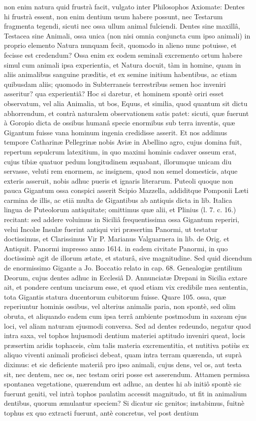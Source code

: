 \documentclass[a4paper, 11pt, oneside, polutonikogreek, german]{article}
\begin{document}
non enim natura quid frustrà facit, vulgato inter Philosophos Axiomate: Dentes hi frustrà essent, non enim dentium usum habere possunt, nec Testarum fragmenta tegendi, sicuti nec ossa ullum animal fulciendi. Dentes sine maxillâ, Testacea sine Animali, ossa unica (non nisi omnia conjuncta cum ipso animali) in proprio elemento Natura nunquam fecit, quomodo in alieno nunc potuisse, et fecisse est credendum? Ossa enim ex eodem seminali excremento ortum habere simul cum animali ipsa experientia, et Natura docuit, tàm in homine, quam in aliis animalibus sanguine præditis, et ex semine initium habentibus, ac etiam quibusdam aliis; quomodo in Subterraneis terrestribus semen hoc inveniri asseritur? qua experientiâ? Hoc si daretur, et hominem spontè oriri esset observatum, vel alia Animalia, ut bos, Equus, et similia, quod quantum sit dictu abhorrendum, et contrà naturalem observationem satis patet: sicuti, quæ fuerunt à Goropio dicta de ossibus humanâ specie enormibus sub terra inventis, quæ Gigantum fuisse vana hominum ingenia credidisse asserit. Et nos addimus tempore Catharinæ Pellegrinæ nobis Aviæ in Abellino agro, cujus domina fuit, repertum sepulcrum latexitium, in quo maximi hominis cadaver osseum erat, cujus tibiæ quatuor pedum longitudinem æquabant, illorumque unicam diu servasse, veluti rem enormem, ac insignem, quod non semel domesticis, atque exteris asseruit, nobis adhuc pueris et ignaris literarum. Puteoli quoque non pauca Gigantum ossa conspici asserit Scipio Mazzella, addiditque Pomponii Læti carmina de illis, ac etiā multa de Gigantibus ab antiquis dicta in lib. Italica lingua de Puteolorum antiquitate; omittimus quæ alii, et Plinius (l. 7. c. 16.) recitant: sed addere voluimus in Siciliâ frequentissima ossa Gigantum reperiri, velui Incolæ Insulæ fuerint antiqui viri præsertim Panormi, ut testatur doctissimus, et Clarissimus Vir P. Marianus Valguarnera in lib. de Orig. et Antiquit. Panormi impresso anno 1614. in eadem civitate Panormi, in quo doctissimè agit de illorum ætate, et staturâ, sive magnitudine. Sed quid dicendum de enormissimo Gigante a Jo. Boccatio relato in cap. 68. Genealogiæ gentilium Deorum, cujus dentes adhuc in Ecclesiâ D. Annunciatæ Drepani in Sicilia extare ait, et pondere centum unciarum esse, et quod etiam vix credibile mea sententia, tota Gigantis statura ducentorum cubitorum fuisse. Quare 105. ossa, quæ reperiuntur hominis ossibus, vel alterius animalis paria, non spontè, sed olim obruta, et aliquando eadem cum ipsa terrâ ambiente postmodum in saxeam ejus loci, vel aliam naturam ejusmodi conversa. Sed ad dentes redeundo, negatur quod intra saxa, vel tophos hujusmodi dentium materiei aptitudo inveniri queat, locis præsertim aridis tophaceis, cùm talis materia excrementitia, et nutitiva potiùs ex aliquo viventi animali proficisci debeat, quam intra terram quærenda, ut suprà diximus: et sic deficiente materiâ pro ipso animali, cujus dens, vel os, aut testa sit, nec dentem, nec os, nec testam oriri posse est asserendum. Attamen permissa spontanea vegetatione, quærendum est adhuc, an dentes hi ab initiô spontè sic fuerunt geniti, vel intrà tophos paulatìm accessit magnitudo, ut fit in animalium dentibus, quorum æmulantur speciem? Si dicatur sic genitos; instabimus, fuitnè tophus ex quo extracti fuerunt, antè concretus, vel post dentium 
\end{document}
